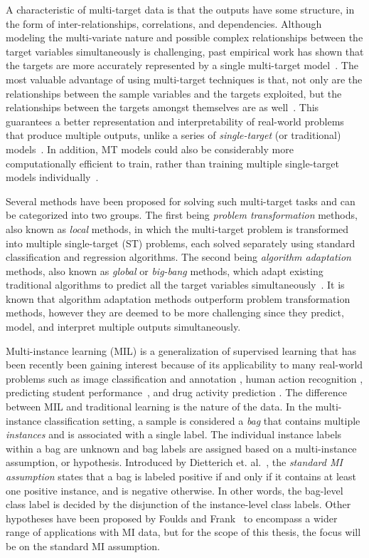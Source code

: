 \documentclass[reqno]{vcuthesis}
\numberwithin{equation}{chapter}
\begin{document}
A characteristic of multi-target data is that the outputs have some structure, in the form of inter-relationships, correlations, and dependencies. Although modeling the multi-variate nature and possible complex relationships between the target variables simultaneously is challenging, past empirical work has shown that the targets are more accurately represented by a single multi-target model~\cite{Caruana1997,Evgeniou2005}. The most valuable advantage of using multi-target techniques is that, not only are the relationships between the sample variables and the targets exploited, but the relationships between the targets amongst themselves are as well~\cite{Baxter1997,Caruana1997}. This guarantees a better representation and interpretability of real-world problems that produce multiple outputs, unlike a series of \textit{single-target} (or traditional) models~\cite{BenDavic2003}. In addition, MT models could also be considerably more computationally efficient to train, rather than training multiple single-target models individually~\cite{evgeniou2004regularized}. 

Several methods have been proposed for solving such multi-target tasks and can be categorized into two groups. The first being \textit{problem transformation} methods, also known as \textit{local} methods, in which the multi-target problem is transformed into multiple single-target (ST) problems, each solved separately using standard classification and regression algorithms. The second being \textit{algorithm adaptation} methods, also known as \textit{global} or \textit{big-bang} methods, which adapt existing traditional algorithms to predict all the target variables simultaneously~\cite{Borchani2015}. It is known that algorithm adaptation methods outperform problem transformation methods, however they are deemed to be more challenging since they predict, model, and interpret multiple outputs simultaneously. 

Multi-instance learning (MIL) is a generalization of supervised learning that has been recently been gaining interest because of its applicability to many real-world problems such as image classification and annotation \cite{Herman2008}, human action recognition \cite{Yi2016}, predicting student performance~\cite{zafra2011multiple}, and drug activity prediction \cite{Dietterich1997}. The difference between MIL and traditional learning is the nature of the data. In the multi-instance classification setting, a sample is considered a \textit{bag} that contains multiple \textit{instances} and is associated with a single label. The individual instance labels within a bag are unknown and bag labels are assigned based on a multi-instance assumption, or hypothesis. Introduced by Dietterich et. al.~\cite{Dietterich1997}, the \textit{standard MI assumption} states that a bag is labeled positive if and only if it contains at least one positive instance, and is negative otherwise. In other words, the bag-level class label is decided by the disjunction of the instance-level class labels. Other hypotheses have been proposed by Foulds and Frank~\cite{Foulds2010} to encompass a wider range of applications with MI data, but for the scope of this thesis, the focus will be on the standard MI assumption. 
\end{document}
